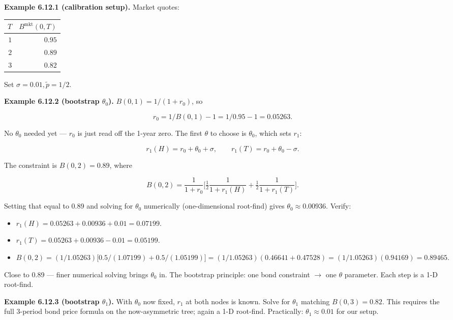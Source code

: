 \documentclass[
  10pt,
  twoside]{book}
\newcounter{none} %
\providecommand{\tightlist}{%
  \setlength{\itemsep}{0pt}\setlength{\parskip}{0pt}}
\begin{document}
\textbf{Example 6.12.1 (calibration setup).} Market quotes:

{\def\LTcaptype{none} %
\begin{table}[H]
\centering
\begin{tabular}{|r|r|}
\toprule
\(T\) & \(B^{\text{mkt}}(0, T)\) \\
\midrule



\(1\) & \(0.95\) \\
\(2\) & \(0.89\) \\
\(3\) & \(0.82\) \\
\bottomrule
\end{tabular}
\end{table}
}

Set \(\sigma = 0.01, \tilde p = 1/2\).

\textbf{Example 6.12.2 (bootstrap \(\theta_0\)).}
\(B(0, 1) = 1/(1 + r_0)\), so

\[r_0 = 1/B(0, 1) - 1 = 1/0.95 - 1 = 0.05263.\]

No \(\theta_0\) needed yet --- \(r_0\) is just read off the 1-year zero.
The first \(\theta\) to choose is \(\theta_0\), which sets \(r_1\):

\[r_1(H) = r_0 + \theta_0 + \sigma, \qquad r_1(T) = r_0 + \theta_0 - \sigma.\]

The constraint is \(B(0, 2) = 0.89\), where

\[B(0, 2) = \frac{1}{1 + r_0}\bigl[\tfrac{1}{2}\frac{1}{1 + r_1(H)} + \tfrac{1}{2}\frac{1}{1 + r_1(T)}\bigr].\]

Setting that equal to 0.89 and solving for \(\theta_0\) numerically
(one-dimensional root-find) gives \(\theta_0 \approx 0.00936\). Verify:

\begin{itemize}
\tightlist
\item
  \(r_1(H) = 0.05263 + 0.00936 + 0.01 = 0.07199\).
\item
  \(r_1(T) = 0.05263 + 0.00936 - 0.01 = 0.05199\).
\item
  \(B(0, 2) = (1/1.05263)\bigl[0.5/(1.07199) + 0.5/(1.05199)\bigr] = (1/1.05263)(0.46641 + 0.47528) = (1/1.05263)(0.94169) = 0.89465.\)
\end{itemize}

Close to 0.89 --- finer numerical solving brings \(\theta_0\) in. The
bootstrap principle: one bond constraint \(\to\) one \(\theta\)
parameter. Each step is a 1-D root-find.

\textbf{Example 6.12.3 (bootstrap \(\theta_1\)).} With \(\theta_0\) now
fixed, \(r_1\) at both nodes is known. Solve for \(\theta_1\) matching
\(B(0, 3) = 0.82\). This requires the full 3-period bond price formula
on the now-asymmetric tree; again a 1-D root-find. Practically:
\(\theta_1 \approx 0.01\) for our setup.
\end{document}
